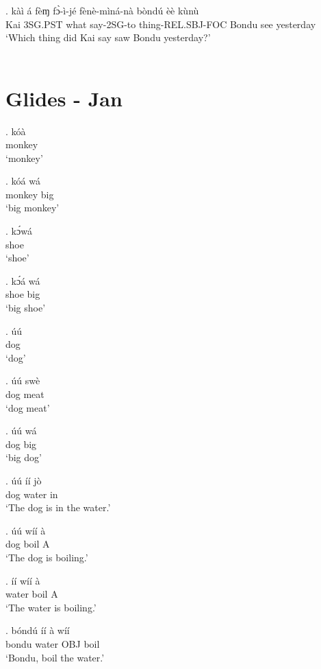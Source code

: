 \documentclass{assets/fieldnotes}
\begin{document}
\exg. kàì á fèɱ fɔ̀-ì-jé fènè-mìná-nà bòndú èè kùnù\\
Kai 3SG.PST what say-2SG-to thing-REL.SBJ-FOC Bondu see yesterday\\
`Which thing did Kai say saw Bondu yesterday?'\\ 

\\ 


\section{Glides - Jan}

\exg. kóà \\
monkey\\
`monkey'

\exg. kóá wá \\
monkey big \\
`big monkey'

\exg. kɔ́wá \\
shoe\\
`shoe'
    
\exg. kɔ́á wá \\
shoe big \\
`big shoe'

\exg. úú \\
dog\\
`dog'

\exg. úú swè \\
dog meat\\
`dog meat'

\exg. úú wá \\
dog big \\
`big dog' 

\exg. úú íí jò\\
dog water in \\
`The dog is in the water.'

\exg. úú wíí à \\
dog boil A \\
`The dog is boiling.'

\exg. íí wíí à \\
water boil A \\
`The water is boiling.'

\exg. bóndú íí à wíí \\
bondu water OBJ boil\\
`Bondu, boil the water.'
\end{document}
